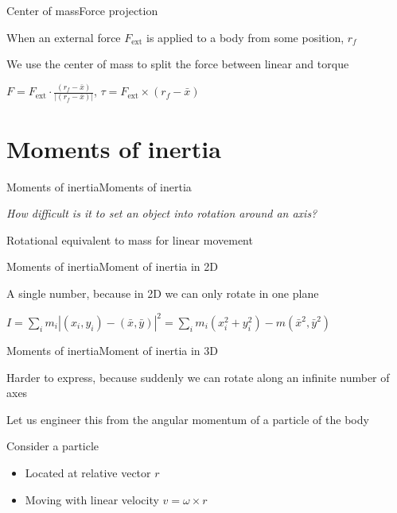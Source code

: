 \documentclass{beamer}
\begin{document}
\begin{slide}{Center of mass}{Force projection}{
\item When an external force $F_{\text{ext}}$ is applied to a body from some position, $r_f$
\item We use the center of mass to split the force between linear and torque
\item $F = F_{\text{ext}} \cdot \frac{(r_f - \bar x)}{|(r_f - \bar x)|}$, $\tau = F_{\text{ext}} \times (r_f - \bar x)$
}\end{slide}

\section{Moments of inertia}
\begin{slide}{Moments of inertia}{Moments of inertia}{
\item \textit{How difficult is it to set an object into rotation around an axis?}
\item Rotational equivalent to mass for linear movement
}\end{slide}


\begin{slide}{Moments of inertia}{Moment of inertia in 2D}{
\item A single number, because in 2D we can only rotate in one plane
\item $I = \sum_i m_i |(x_i,y_i) - (\bar x, \bar y)| ^2 = \sum_i m_i (x_i^2 + y_i^2) - m(\bar x^2, \bar y^2)$
}\end{slide}

\begin{slide}{Moments of inertia}{Moment of inertia in 3D}{
\item Harder to express, because suddenly we can rotate along an infinite number of axes
\item Let us engineer this from the angular momentum of a particle of the body
\item Consider a particle 
\begin{itemize}
\item Located at relative vector $r$
\item Moving with linear velocity $v = \omega \times r$
\end{itemize}
}\end{slide}
\end{document}
